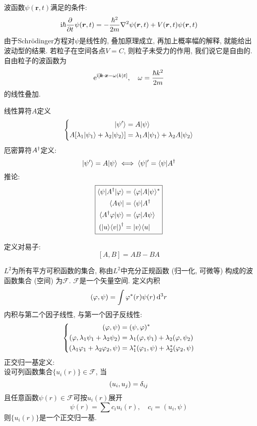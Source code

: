 \documentclass[UTF8]{ctexart}
\numberwithin{equation}{subsection}
\begin{document}
波函数$\psi(\bm{r},t)$满足的条件:
$$\mathrm{i}\hbar\frac{\partial^{} }{\partial t^{}}\psi(\bm{r},t)=-\frac{\hbar^2}{2m}\nabla^2\psi(\bm{r},t)+V(\bm{r},t)\psi(\bm{r},t)$$
由于Schrödinger方程对$\psi$是线性的, 叠加原理成立, 再加上概率幅的解释, 就能给出波动型的结果. 
若粒子在空间各点$V=C$, 则粒子未受力的作用, 我们说它是自由的. 自由粒子的波函数为
$$\mathrm{e}^{\mathrm{i}[\bm{k}\cdot \bm{x}-\omega(k) t]},\quad \omega=\frac{\hbar k^2}{2m}$$
的线性叠加.


线性算符$A$定义
$$\left\{\begin{aligned} 
    | {\psi'} \rangle &= A| {\psi} \rangle\\
    A[\lambda_1| {\psi_1} \rangle+\lambda_2| {\psi_2} \rangle] &= \lambda_1A| {\psi_1} \rangle+\lambda_2A| {\psi_2} \rangle
 \end{aligned}\right.$$
厄密算符$A^{\dagger}$定义: 
$$| {\psi'} \rangle=A| {\psi} \rangle\iff \langle {\psi} |'=\langle {\psi} |A^{\dagger}$$
推论:
$$\boxed{
    \begin{aligned} 
        \langle {\psi} |A^{\dagger}| {\varphi} \rangle&=\langle {\varphi} |A| {\psi} \rangle^*\\
        \langle {A\psi} |&=\langle {\psi} |A^{\dagger}\\
        \langle {A^{\dagger}\varphi|\psi} \rangle&=\langle {\varphi|A\psi} \rangle\\
        \left( | {u} \rangle\langle {v} | \right)^{\dagger}&=| {v} \rangle\langle {u} |
 \end{aligned}}$$

定义对易子:
$$[A,B]=AB-BA$$


$L^2$为所有平方可积函数的集合, 称由$L^2$中充分正规函数 (归一化, 可微等) 构成的波函数集合 (空间) 为$\mathscr{F}$. 
$\mathscr{F}$是一个矢量空间. 
定义内积
$$(\varphi,\psi)=\int\varphi^*(r)\psi(r)\mathop{}\!\mathrm{d}^3r$$
内积与第二个因子线性, 与第一个因子反线性:
$$\left\{\begin{aligned} 
    (\varphi,\psi)&=(\psi,\varphi)^*\\
    (\varphi,\lambda_1\psi_1+\lambda_2\psi_2)&=\lambda_1(\varphi,\psi_1)+\lambda_2(\varphi,\psi_2)\\
    (\lambda_1\varphi_1+\lambda_2\varphi_2,\psi) &= \lambda_1^*(\varphi_1,\psi)+\lambda_2^*(\varphi_2,\psi)\\
 \end{aligned}\right.$$
正交归一基定义:\\
设可列函数集合$\{u_i(r)\}\in\mathscr{F}$, 当
$$(u_i,u_j)=\delta_{ij}$$
且任意函数$\psi(r)\in\mathscr{F}$可按$u_i(r)$展开
$$\psi(r)=\sum c_iu_i(r),\quad c_i=(u_i,\psi)$$
则$\{u_i(r)\}$是一个正交归一基. 
\end{document}
